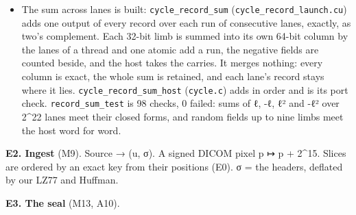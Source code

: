 \begin{itemize}
\item The sum across lanes is built: \texttt{cycle\_\allowbreak{}record\_\allowbreak{}sum} (\texttt{cycle\_\allowbreak{}record\_\allowbreak{}launch.\allowbreak{}cu}) adds one output of every record over each run of consecutive lanes, exactly, as two's complement. Each 32-bit limb is summed into its own 64-bit column by the lanes of a thread and one atomic add a run, the negative fields are counted beside, and the host takes the carries. It merges nothing: every column is exact, the whole sum is retained, and each lane's record stays where it lies. \texttt{cycle\_\allowbreak{}record\_\allowbreak{}sum\_\allowbreak{}host} (\texttt{cycle.\allowbreak{}c}) adds in order and is its port check. \texttt{record\_\allowbreak{}sum\_\allowbreak{}test} is 98 checks, 0 failed: sums of ℓ, -ℓ, ℓ² and -ℓ² over 2\textasciicircum{}22 lanes meet their closed forms, and random fields up to nine limbs meet the host word for word.
\end{itemize}

\textbf{E2. Ingest} (M9). Source → (u, σ). A signed DICOM pixel p ↦ p + 2\textasciicircum{}15. Slices are ordered by an exact key from their positions (E0). σ = the headers, deflated by our LZ77 and Huffman.

\textbf{E3. The seal} (M13, A10).

